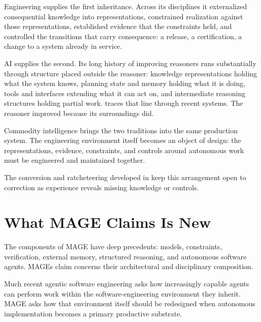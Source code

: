 Engineering supplies the first inheritance. Across its disciplines it externalized consequential knowledge into representations, constrained realization against those representations, established evidence that the constraints held, and controlled the transitions that carry consequence: a release, a certification, a change to a system already in service.

AI supplies the second. Its long history of improving reasoners runs substantially through structure placed outside the reasoner: knowledge representations holding what the system knows, planning state and memory holding what it is doing, tools and interfaces extending what it can act on, and intermediate reasoning structures holding partial work.  traces that line through recent systems. The reasoner improved because its surroundings did.

Commodity intelligence brings the two traditions into the same production system. The engineering environment itself becomes an object of design: the representations, evidence, constraints, and controls around autonomous work must be engineered and maintained together.

The conversion and ratcheteering developed in  keep this arrangement open to correction as experience reveals missing knowledge or controls.

\section{What MAGE Claims Is New}\label{heading:what-mage-claims-is-new}


The components of MAGE have deep precedents: models, constraints, verification, external memory, structured reasoning, and autonomous software agents. MAGE\textquotesingle s claim concerns their architectural and disciplinary composition.

Much recent agentic software engineering asks how increasingly capable agents can perform work within the software-engineering environment they inherit. MAGE asks how that environment itself should be redesigned when autonomous implementation becomes a primary productive substrate.


